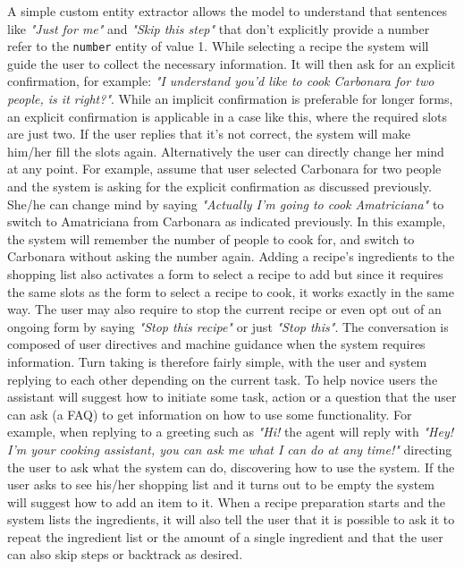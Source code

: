 \documentclass[journal, 11pt]{IEEEtran}
\begin{document}
A simple custom entity extractor allows the model to understand that sentences like \textit{"Just for me"} and \textit{"Skip this step"} that don't explicitly provide a number refer to the \texttt{number} entity of value 1.
While selecting a recipe the system will guide the user to collect the necessary information.
It will then ask for an explicit confirmation, for example: \textit{"I understand you'd like to cook Carbonara for two people, is it right?"}.
While an implicit confirmation is preferable for longer forms, an explicit confirmation is applicable in a case like this, where the required slots are just two.
If the user replies that it's not correct, the system will make him/her fill the slots again. 
Alternatively the user can directly change her mind at any point. For example, assume that user selected Carbonara for two people and the system is asking for the explicit confirmation as discussed previously. She/he can change mind by saying \textit{"Actually I'm going to cook Amatriciana"} to switch to Amatriciana from Carbonara as indicated previously.
In this example, the system will remember the number of people to cook for, and switch to Carbonara without asking the number again.
Adding a recipe's ingredients to the shopping list also activates a form to select a recipe to add but since it requires the same slots as the form to select a recipe to cook, it works exactly in the same way.
The user may also require to stop the current recipe or even opt out of an ongoing form by saying \textit{"Stop this recipe"} or just \textit{"Stop this"}.
The conversation is composed of user directives and machine guidance when the system requires information.
Turn taking is therefore fairly simple, with the user and system replying to each other depending on the current task.
To help novice users the assistant will suggest how to initiate some task, action or a question that the user can ask (a FAQ) to get information on how to use some functionality.
For example, when replying to a greeting such as \textit{"Hi!} the agent will reply with \textit{"Hey! I'm your cooking assistant, you can ask me what I can do at any time!"} directing the user to ask what the system can do, discovering how to use the system.
If the user asks to see his/her shopping list and it turns out to be empty the system will suggest how to add an item to it. When a recipe preparation starts and the system lists the ingredients, it will also tell the user that it is possible to ask it to repeat the ingredient list or the amount of a single ingredient and that the user can also skip steps or backtrack as desired.
\end{document}
